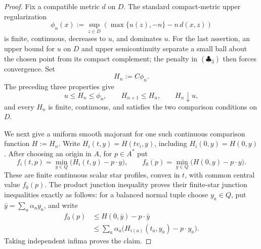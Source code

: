 \begin{proof}
Fix a compatible metric \(d\) on \(D\).  The standard compact-metric
upper regularization
\[
 \phi_n(x):=\sup_{z\in D}
 \left(\max\{u(z),-n\}-n\,d(x,z)\right)
 \tag{\(\clubsuit_3\)}
\]
is finite, continuous, decreases to \(u\), and dominates \(u\).  For the
last assertion, an upper bound for \(u\) on \(D\) and upper
semicontinuity separate a small ball about the chosen point from its compact
complement; the penalty in \((\clubsuit_3)\) then forces convergence.  Set
\[
                              H_n:=C\phi_n.
\]
The preceding three properties give
\[
       u\leq H_n\leq\phi_n,\qquad H_{n+1}\leq H_n,\qquad H_n\downarrow u,
 \tag{\(\clubsuit_4\)}
\]
and every \(H_n\) is finite, continuous, and satisfies the two comparison
conditions on \(D\).

We next give a uniform smooth majorant for one such continuous comparison
function \(H:=H_n\).  Write \(H_i(t,y)=H(tv_i,y)\), including
\(H_i(0,y)=H(0,y)\).  After choosing an origin in \(A\), for
\(p\in A^*\) put
\[
 f_i(t,p)=\min_{y\in Q}\bigl(H_i(t,y)-p\mathbin\cdot y\bigr),
 \qquad
 f_0(p)=\min_{y\in Q}\bigl(H(0,y)-p\mathbin\cdot y\bigr).
 \tag{\(\spadesuit\)}
\]
These are finite continuous scalar star profiles, convex in \(t\), with
common central value \(f_0(p)\).  The product junction inequality proves
their finite-star junction inequalities exactly as follows: for a balanced
normal tuple choose \(y_a\in Q\), put \(\bar y=\sum_a\alpha_ay_a\), and
write
\[
 \begin{split}
 f_0(p)
 &\leq H(0,\bar y)-p\mathbin\cdot\bar y\\
 &\leq\sum_a\alpha_a
      \bigl(H_{i(a)}(t_a,y_a)-p\mathbin\cdot y_a\bigr).
 \end{split}
 \tag{\(\spadesuit_1\)}
\]
Taking independent infima proves the claim.


\end{proof}
